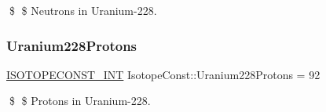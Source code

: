\$ \$ Neutrons in Uranium-\/228. \mbox{\label{group___isotope_const-_uranium-_u228_ga5337da80ce972219ada1ddb35555e86f}} 
\subsubsection{\texorpdfstring{Uranium228\+Protons}{Uranium228Protons}}
{\footnotesize\ttfamily \mbox{\hyperlink{group___isotope_const-_macros_ga5f18360b3e99483a35c32d789e62621c}{I\+S\+O\+T\+O\+P\+E\+C\+O\+N\+S\+T\+\_\+\+I\+NT}} Isotope\+Const\+::\+Uranium228\+Protons = 92}

\$ \$ Protons in Uranium-\/228. 